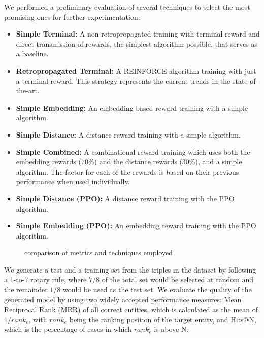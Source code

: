 We performed a preliminary evaluation of several techniques to select the most promising ones for further experimentation:

\begin{itemize}
    \item\textbf{Simple Terminal:} A non-retropropagated training with terminal reward and direct transmission of rewards, the simplest algorithm possible, that serves as a baseline.
    \item\textbf{Retropropagated Terminal:} A REINFORCE algorithm training with just a terminal reward. This strategy represents the current trends in the state-of-the-art.
    \item\textbf{Simple Embedding:} An embedding-based reward training with a simple algorithm.
    \item\textbf{Simple Distance:} A distance reward training with a simple algorithm.
    \item\textbf{Simple Combined:} A combinational reward training which uses both the embedding rewards (70\%) and the distance rewards (30\%), and a simple algorithm. The factor for each of the rewards is based on their previous performance when used individually.
    \item\textbf{Simple Distance (PPO):} A distance reward training with the PPO algorithm.
    \item\textbf{Simple Embedding (PPO):} An embedding reward training with the PPO algorithm.
\end{itemize}

\begin{figure}[!h]
    \centering
    
    \caption{comparison of metrics and techniques employed}
    \label{fig:metricsbarchart}
\end{figure}

We generate a test and a training set from the triples in the dataset by following a 1-to-7 rotary rule, where $7$/$8$ of the total set would be selected at random and the remainder $1$/$8$ would be used as the test set. We evaluate the quality of the generated model by using two widely accepted performance measures: Mean Reciprocal Rank (MRR) of all correct entities, which is calculated as the mean of $1/rank_{e}$, with $rank_{e}$ being the ranking position of the target entity, and Hits@N, which is the percentage of cases in which $rank_{e}$ is above N. 



